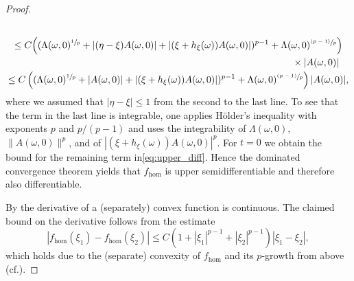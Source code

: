 \documentclass[11pt]{article}
\newcommand{\cf}{cf.\xspace}
\numberwithin{equation}{section}
\newcommand{\psfrac}[2]{\sfrac{(#1)}{#2}}
\theoremstyle{definition}
\let\w\omega
\begin{document}
\begin{proof}
\begin{multline*}
\\
\leq C \Bigl((\Lambda(\w,0)^{\sfrac{1}{p}}+|(\eta-\xi)A(\w,0)|+|(\xi+h_{\xi}(\w))A(\w,0)|)^{p-1}+\Lambda(\w,0)^{\psfrac{p-1}{p}}\Bigr)\\
\shoveright{{}\times|A(\w,0)|}
\\
\leq C \left((\Lambda(\w,0)^{\sfrac{1}{p}}+|A(\w,0)|+|(\xi+h_{\xi}(\w))A(\w,0)|)^{p-1}+\Lambda(\w,0)^{\psfrac{p-1}{p}}\right)|A(\w,0)|,
\end{multline*}
where we assumed that $|\eta-\xi|\leq 1$ from the second to the last line.
To see that the term in the last line is integrable, one applies Hölder's inequality with exponents $p$ and $p/(p-1)$ and uses the integrability of $\Lambda(\w,0)$, $\|A(\w,0)\|^p$, and of $|(\xi+h_{\xi}(\w))A(\w,0)|^p$. For $t=0$ we obtain the bound for the remaining term in\eqref{eq:upper_diff}. Hence the dominated convergence theorem yields that $f_{\hom}$ is upper semidifferentiable and therefore also differentiable.

By \cite[Th.\,4.65]{FoLe} the derivative of a (separately) convex function is continuous. The claimed bound on the derivative follows from the estimate
\begin{equation*}
|f_{\hom}(\xi_1)-f_{\hom}(\xi_2)|\leq C(1+|\xi_1|^{p-1}+|\xi_2|^{p-1})|\xi_1-\xi_2|,
\end{equation*}
which holds due to the (separate) convexity of $f_{\hom}$ and its $p$-growth from above (\cf \cite[Prop.\,4.64]{FoLe}).
\end{proof}
\end{document}
